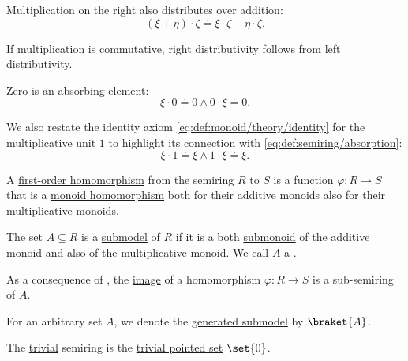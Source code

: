 \begin{definition}
\begin{thmenum}
\begin{thmenum}
       Multiplication on the right also distributes over addition:
      \begin{equation}\label{eq:def:semiring/right_distributivity}
        (\xi + \eta) \cdot \zeta \doteq \xi \cdot \zeta + \eta \cdot \zeta.
      \end{equation}

      If multiplication is commutative, right distributivity follows from left distributivity.

       Zero is an absorbing element:
      \begin{equation}\label{eq:def:semiring/absorption}
        \xi \cdot 0 \doteq 0 \wedge 0 \cdot \xi \doteq 0.
      \end{equation}

       We also restate the identity axiom \eqref{eq:def:monoid/theory/identity} for the multiplicative unit \( 1 \) to highlight its connection with \eqref{eq:def:semiring/absorption}:
      \begin{equation}\label{eq:def:semiring/identity}
        \xi \cdot 1 \doteq \xi \wedge 1 \cdot \xi \doteq \xi.
      \end{equation}
    \end{thmenum}

     A \hyperref[def:first_order_homomorphism]{first-order homomorphism} from the semiring \( R \) to \( S \) is a function \( \varphi: R \to S \) that is a \hyperref[def:monoid/homomorphism]{monoid homomorphism} both for their additive monoids also for their multiplicative monoids.

     The set \( A \subseteq R \) is a \hyperref[thm:substructure_is_model]{submodel} of \( R \) if it is a both \hyperref[def:monoid/submodel]{submonoid} of the additive monoid and also of the multiplicative monoid. We call \( A \) a .

    As a consequence of , the \hyperref[def:multi_valued_function/image]{image} of a homomorphism \( \varphi: R \to S \) is a sub-semiring of \( A \).

    For an arbitrary set \( A \), we denote the \hyperref[def:first_order_generated_substructure]{generated submodel} by \( \braket{ A } \).

     The \hyperref[thm:substructures_form_complete_lattice/bottom]{trivial} semiring is the \hyperref[def:pointed_set/trivial]{trivial pointed set} \( \set{ 0 } \).


\end{thmenum}
\end{definition}
